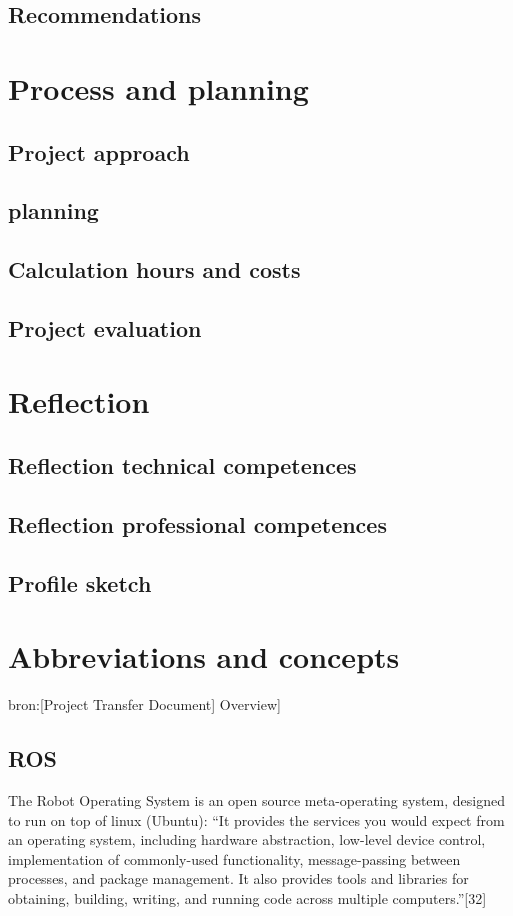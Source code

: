 \documentclass[12pt,a4paper]{report}
\begin{document}
\section{Recommendations}

\chapter{Process and planning}
\section{Project  approach}

\section{planning}

\section{Calculation hours and costs}

\section{Project evaluation}

\chapter{Reflection}
\section{Reflection technical competences}

\section{Reflection professional competences}

\section{Profile sketch}

\chapter{Abbreviations and concepts}
bron:[Project Transfer Document] Overview]
\section{ROS}
The Robot Operating System is an open source meta-operating system, designed to run on top of linux (Ubuntu): “It provides the services you would expect from an operating system, including hardware abstraction, low-level device control, implementation of commonly-used functionality, message-passing between processes, and package management. It also provides tools and libraries for obtaining, building, writing, and running code across multiple computers.”[32]
\end{document}
